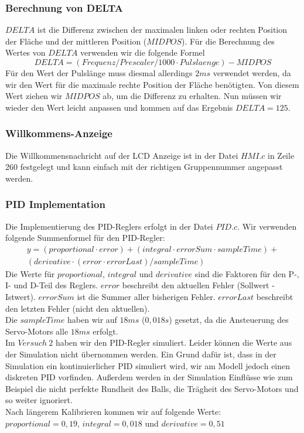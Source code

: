 \subsubsection{Berechnung von DELTA}
$DELTA$ ist die Differenz zwischen der maximalen linken oder rechten Position der Fläche und der mittleren Position ($MIDPOS$). Für die Berechnung des Wertes von $DELTA$ verwenden wir die folgende Formel
\begin{equation}
DELTA = (Frequenz / Prescaler / 1000 \cdot Pulslaenge) - MIDPOS
\end{equation}
Für den Wert der Pulslänge muss diesmal allerdings $2 ms$ verwendet werden, da wir den Wert für die maximale rechte Position der Fläche benötigten. Von diesem Wert ziehen wir $MIDPOS$ ab, um die Differenz zu erhalten. Nun müssen wir wieder den Wert leicht anpassen und kommen auf das Ergebnis $DELTA = 125$.

\subsubsection{Willkommens-Anzeige}
Die Willkommensnachricht auf der LCD Anzeige ist in der Datei $HMI.c$ in Zeile 260 festgelegt und kann einfach mit der richtigen Gruppennummer angepasst werden.

\subsubsection{PID Implementation}
Die Implementierung des PID-Reglers erfolgt in der Datei $PID.c$. Wir verwenden folgende Summenformel für den PID-Regler:
\begin{multline}
y = (proportional \cdot error) + (integral \cdot errorSum \cdot sampleTime) + \\
(derivative \cdot (error \cdot errorLast) / sampleTime)
\end{multline}
Die Werte für $proportional$, $integral$ und $derivative$ sind die Faktoren für den P-, I- und D-Teil des Reglers. $error$ beschreibt den aktuellen Fehler (Sollwert - Istwert). $errorSum$ ist die Summer aller bisherigen Fehler. $errorLast$ beschreibt den letzten Fehler (nicht den aktuellen). \\
Die $sampleTime$ haben wir auf $18 ms$ ($0,018s$) gesetzt, da die Ansteuerung des Servo-Motors alle $18 ms$ erfolgt. \\
Im $Versuch\ 2$ haben wir den PID-Regler simuliert. Leider können die Werte aus der Simulation nicht übernommen werden. Ein Grund dafür ist, dass in der Simulation ein kontinuierlicher PID simuliert wird, wir am Modell jedoch einen diskreten PID vorfinden. Außerdem werden in der Simulation Einflüsse wie zum Beispiel die nicht perfekte Rundheit des Balls, die Trägheit des Servo-Motors und so weiter ignoriert. \\
Nach längerem Kalibrieren kommen wir auf folgende Werte: \\
$proportional = 0,19$, $integral =0,018$ und $derivative = 0,51$


